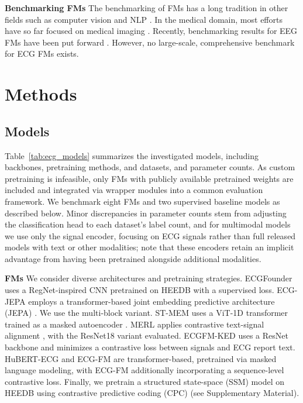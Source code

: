 \documentclass{article}
\newcommand{\heading}[1]{\noindent\textbf{#1}}
\begin{document}
    \heading{Benchmarking FMs} 
    The benchmarking of FMs has a long tradition in other fields such as computer vision \citep{goldblum2023battle} and NLP \citep{chang2024survey}. In the medical domain, most efforts have so far focused on medical imaging \citep{neidlinger2024benchmarking,lee2025benchmarking}. Recently, benchmarking results for EEG FMs have been put forward \citep{xiong2025eeg}. However, no large-scale, comprehensive benchmark for ECG FMs exists.



    \section{Methods}

        \subsection{Models}\label{sec:models}
        Table~\ref{tab:ecg_models} summarizes the investigated models, including backbones, pretraining methods, and datasets, and parameter counts. As custom pretraining is infeasible, only FMs with publicly available pretrained weights are included and integrated via wrapper modules into a common evaluation framework. We benchmark eight FMs and two supervised baseline models as described below. Minor discrepancies in parameter counts stem from adjusting the classification head to each dataset’s label count, and for multimodal models we use only the signal encoder, focusing on ECG signals rather than full released models with text or other modalities; note that these encoders retain an implicit advantage from having been pretrained alongside additional modalities.
    
        \heading{FMs} We consider diverse architectures and pretraining strategies. ECGFounder \citep{doi:10.1056/AIoa2401033} uses a RegNet-inspired CNN pretrained on HEEDB with a supervised loss. ECG-JEPA \citep{kim2024learning} employs a transformer-based joint embedding predictive architecture (JEPA) \citep{assran2023self}. We use the multi-block variant. ST-MEM \citep{na2024guiding} uses a ViT-1D transformer trained as a masked autoencoder \citep{he2022masked}. MERL \citep{10.5555/3692070.3693362} applies contrastive text-signal alignment \citep{radford2021learning}, with the ResNet18 variant evaluated. ECGFM-KED \citep{tian2024foundation} uses a ResNet backbone and minimizes a contrastive loss between signals and ECG report text. HuBERT-ECG and ECG-FM \citep{mckeen2024ecg} are transformer-based, pretrained via masked language modeling, with ECG-FM additionally incorporating a sequence-level contrastive loss. Finally, we pretrain a structured state-space (SSM) model on HEEDB using contrastive predictive coding (CPC) \citep{oord2018representation,mehari2023towards} (see Supplementary Material).
    
\end{document}
